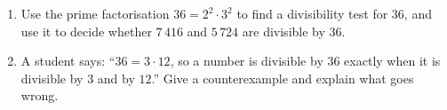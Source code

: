 \begin{enumerate}
\item[(a)] Use the prime factorisation $36=2^2\cdot3^2$ to find a divisibility test for $36$, and use it to decide whether $7\,416$ and $5\,724$ are divisible by $36$.
\item[(b)] A student says: ``$36=3\cdot12$, so a number is divisible by $36$ exactly when it is divisible by $3$ and by $12$.'' Give a counterexample and explain what goes wrong.
\end{enumerate}
